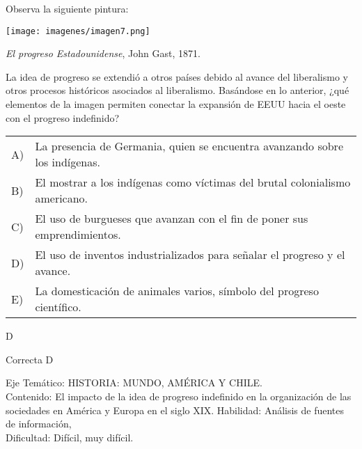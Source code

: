 \documentclass[letterpaper,11pt]{article}
\newcommand{\anchopregunta}{0.9\textwidth}
\begin{document}
\begin{enumerate}
\begin{minipage}{\anchopregunta} 
\item Observa la siguiente pintura:\\
\begin{center}
\texttt{[image: imagenes/imagen7.png]}
\end{center}
\begin{flushright}
\textit{El progreso Estadounidense}, John Gast, 1871.
\end{flushright}
La idea de progreso se extendió a otros países debido al avance del liberalismo y otros procesos históricos asociados al liberalismo. Basándose en lo anterior, ¿qué elementos de la imagen permiten conectar la expansión de EEUU hacia el oeste con el progreso indefinido? 
\begin{flushleft}\begin{tabular}{@{\hspace{-.001\textwidth}}l@{\hspace{2pt}}p{}}
A)& La presencia de Germania, quien se encuentra avanzando sobre los indígenas.\\
B)& El mostrar a los indígenas como víctimas del brutal colonialismo americano.\\
C)& El uso de burgueses que avanzan con el fin de poner sus emprendimientos.\\
D)& El uso de inventos industrializados para señalar el progreso y el avance.\\
E)& La domesticación de animales varios, símbolo del progreso científico.\\ 
\end{tabular}\end{flushleft}%
\begin{key} D
\end{key} 
\begin{hint}
\end{hint}
\begin{answer} Correcta D \\
\end{answer}
\begin{info} %
\begin{flushleft}
Eje Temático: HISTORIA: MUNDO, AMÉRICA Y CHILE.\\
Contenido: El impacto de la idea de progreso indefinido en la organización de las sociedades en América y Europa en el siglo XIX.
Habilidad: Análisis de fuentes de información,\\
Dificultad: Difícil, muy difícil.\\
\end{flushleft} 
\end{info}
\end{minipage}\vfill$\;$ %


\end{enumerate}
\end{document}
